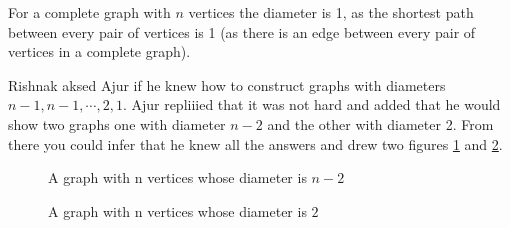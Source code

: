 For a complete graph with $n$ vertices the diameter is 1, as the shortest path between every pair of vertices is 1 (as there is an edge between every pair of vertices in a complete graph). 

Rishnak aksed Ajur if he knew how to construct graphs with diameters $n-1, n-1, \cdots, 2, 1$. Ajur repliiied that it was not hard and added that he would show two graphs one with diameter $n-2$ and the other with diameter 2. From there you could infer that he knew all the answers and drew two figures \ref{12g5} and \ref{12g6}.
\begin{figure}
\begin{center}
\caption{ A graph with n vertices whose diameter is $n-2$ }\label{12g5}
\end{center}
\end{figure}
\begin{figure}
 \begin{center}
\caption{ A graph with n vertices whose diameter is $2$ }\label{12g6}
\end{center}
\end{figure}


